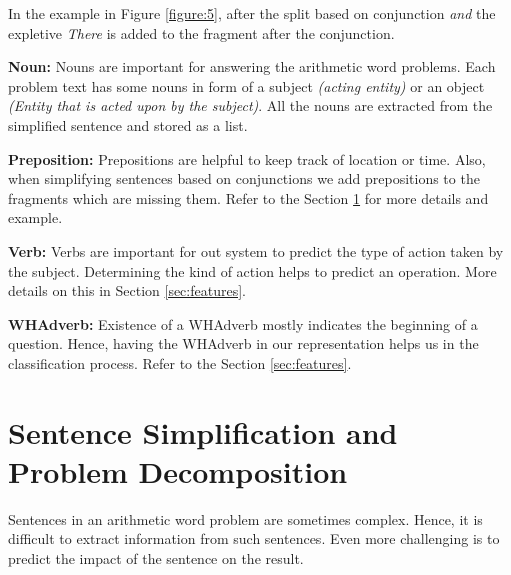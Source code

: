 \documentclass[11pt]{article}
\begin{document}
In the example in Figure \ref{figure:5}, after the split based on conjunction \textit{and} the expletive \textit{There} is added to the fragment after the conjunction.
\vspace{4mm}

\textbf{Noun:} Nouns are important for answering the arithmetic word problems. Each problem text has some nouns in form of a subject \textit{(acting entity)} or an object \textit{(Entity that is acted upon by the subject)}. All the nouns are extracted from the simplified sentence and stored as a list. 
\vspace{4mm}

\textbf{Preposition:} Prepositions are helpful to keep track of location or time. Also, when simplifying sentences based on conjunctions we add prepositions to the fragments which are missing them. Refer to the Section \ref{sec:sentencesimplification} for more details and example.
\vspace{4mm}

\newpage

\textbf{Verb:} Verbs are important for out system to predict the type of action taken by the subject. Determining the kind of action helps to predict an operation. More details on this in Section \ref{sec:features}.
\vspace{4mm}

\textbf{WHAdverb:} Existence of a WHAdverb mostly indicates the beginning of a question. Hence, having the WHAdverb in our representation helps us in the classification process. Refer to the Section \ref{sec:features}.

\section{Sentence Simplification and Problem Decomposition} \label{sec:sentencesimplification}
Sentences in an arithmetic word problem are sometimes complex. Hence, it is difficult to extract information from such sentences. Even more challenging is to predict the impact of the sentence on the result. 
\end{document}
